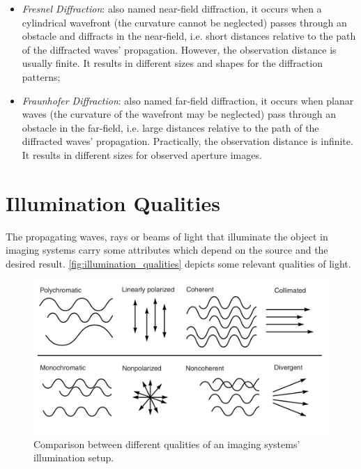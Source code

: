 \begin{itemize}
    \item \emph{Fresnel Diffraction}: also named near-field diffraction, it occurs when a cylindrical wavefront (the curvature cannot be neglected) passes through an obstacle and diffracts in the near-field, i.e. short distances relative to the path of the diffracted waves' propagation. However, the observation distance is usually finite. It results in different sizes and shapes for the diffraction patterns;
    
    \item \emph{Fraunhofer Diffraction}: also named far-field diffraction, it occurs when planar waves (the curvature of the wavefront may be neglected) pass through an obstacle in the far-field, i.e. large distances relative to the path of the diffracted waves' propagation. Practically, the observation distance is infinite. It results in different sizes for observed aperture images.
    
\end{itemize}

\section{Illumination Qualities}

The propagating waves, rays or beams of light that illuminate the object in imaging systems carry some attributes which depend on the source and the desired result. \autoref{fig:illumination_qualities} depicts some relevant qualities of light. 

\begin{figure}[htb]
	\centering
	\caption{\label{fig:illumination_qualities} Comparison between different qualities of an imaging systems' illumination setup.}
	\begin{center}
	    \includegraphics[scale=0.4]{images/light_qualities.png}
	\end{center}
	\centering
\end{figure}

